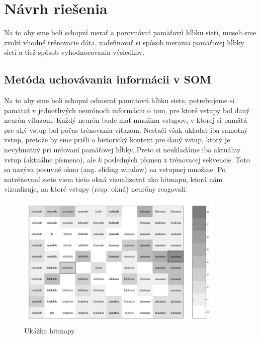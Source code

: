 \chapter{Návrh riešenia}
Na to aby sme boli schopní merať a porovnávať pamäťovú hĺbku sietí, museli sme 
zvoliť vhodné trénovacie dáta, zadefinovať si spôsob merania pamäťovej hĺbky 
sietí a tiež spôsob vyhodnocovania výsledkov.

\section{Metóda uchovávania informácii v SOM}
Na to aby sme boli schopní odmerať pamäťovú hĺbku siete, potrebujeme si pamätať v jednotlivých
neurónoch informáciu o tom, pre ktoré vstupy bol daný neurón víťazom.
Každý neurón bude mať množinu vstupov, v ktorej si pamätá pre aký vstup bol počas trénovania víťazom. 
Nestačí však ukladať iba samotný vstup, pretože by sme prišli o historický kontext pre daný vstup, 
ktorý je nevyhnutný pri určovaní pamäťovej hĺbky.
Preto si neukladáme iba aktuálny vstup (aktuálne písmeno), 
ale $k$ posledných písmen z trénovacej sekvencie.
Toto sa nazýva posuvné okno (ang. sliding window) na vstupnej množine. 
Po natrénovaní siete viem tieto okná vizualizovať ako hitmapu, 
ktorá nám vizualizuje, na ktoré vstupy (resp. okná) neuróny reagovali.

\begin{figure}[H]
	\centering
	\includegraphics[width=10cm]{assets/receptive_field}
	\caption{Ukážka hitmapy}
\end{figure}
 
